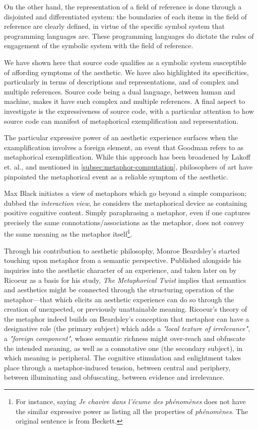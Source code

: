 
On the other hand, the representation of a field of reference is done through a disjointed and differentiated system: the boundaries of each items in the field of reference are clearly defined, in virtue of the specific symbol system that programming languages are. These programming languages do dictate the rules of engagement of the symbolic system with the field of reference.

We have shown here that source code qualifies as a symbolic system susceptible of affording symptoms of the aesthetic. We have also highlighted its specificities, particularly in terms of descriptions and representations, and of complex and multiple references. Source code being a dual language, between human and machine, makes it have such complex and multiple references. A final aspect to investigate is the expressiveness of source code, with a particular attention to how source code can manifest of metaphorical exemplification and representation.

The particular expressive power of an aesthetic experience surfaces when the examplification involves a foreign element, an event that Goodman refers to as metaphorical exemplification. While this approach has been broadened by Lakoff et. al., and mentioned in \ref{subsec:metaphor-computation}, philosophers of art have pinpointed the metaphorical event as a reliable symptom of the aesthetic.

Max Black initiates a view of metaphors which go beyond a simple comparison; dubbed the \emph{interaction view}, he considers the metaphorical device as containing positive cognitive content. Simply paraphrasing a metaphor, even if one captures precisely the same connotations/associations as the metaphor, does not convey the same meaning as the metaphor itself\footnote{For instance, saying \emph{Je chavire dans l'écume des phénomènes} does not have the similar expressive power as listing all the properties of \emph{phénomènes}. The original sentence is from Beckett.}.

Through his contribution to aesthetic philosophy, Monroe Beardsley's started touching upon metaphor from a semantic perspective. Published alongside his inquiries into the aesthetic character of an experience, and taken later on by Ricoeur as a basis for his study, \emph{The Metaphorical Twist} implies that semantics and aesthetics might be connected through the structuring operation of the metaphor—that which elicits an aesthetic experience can do so through the creation of unexpected, or previously unattainable meaning. Ricoeur's theory of the metaphor indeed builds on Beardsley's conception that metaphor can have a designative role (the primary subject) which adds a \emph{"local texture of irrelevance"}, a \emph{"foreign component"}, whose semantic richness might over-reach and obfuscate the intended meaning, as well as a connotative one (the secondary subject), in which meaning is peripheral. The cognitive stimulation and enlightment takes place through a metaphor-induced tension, between central and periphery, between illuminating and obfuscating, between evidence and irrelevance.

